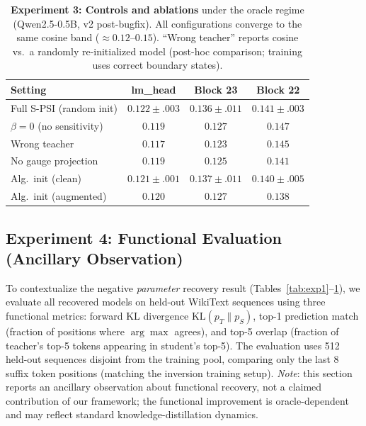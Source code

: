\documentclass{article}
\begin{document}
\begin{table}[t]
\centering
\caption{\textbf{Experiment 3: Controls and ablations} under the oracle regime (Qwen2.5-0.5B, v2 post-bugfix). All configurations converge to the same cosine band ($\approx 0.12$--$0.15$). ``Wrong teacher'' reports cosine vs.\ a randomly re-initialized model (post-hoc comparison; training uses correct boundary states).}
\label{tab:exp3}
\small
\begin{tabular}{@{}l ccc@{}}
\toprule
\textbf{Setting} & \textbf{lm\_head} & \textbf{Block 23} & \textbf{Block 22} \\
\midrule
Full S-PSI (random init)  & $0.122 \pm .003$ & $0.136 \pm .011$ & $0.141 \pm .003$ \\
$\beta = 0$ (no sensitivity) & $0.119$ & $0.127$ & $0.147$ \\
Wrong teacher             & $0.117$ & $0.123$ & $0.145$ \\
No gauge projection       & $0.119$ & $0.125$ & $0.141$ \\
Alg.\ init (clean)       & $0.121 \pm .001$ & $0.137 \pm .011$ & $0.140 \pm .005$ \\
Alg.\ init (augmented)   & $0.120$ & $0.127$ & $0.138$ \\
\bottomrule
\end{tabular}
\end{table}


\subsection{Experiment 4: Functional Evaluation (Ancillary Observation)}
\label{sec:exp4}

To contextualize the negative \emph{parameter} recovery result (Tables~\ref{tab:exp1}--\ref{tab:exp3}), we evaluate all recovered models on held-out WikiText sequences using three functional metrics: forward KL divergence $\mathrm{KL}(p_T \| p_S)$, top-1 prediction match (fraction of positions where $\arg\max$ agrees), and top-5 overlap (fraction of teacher's top-5 tokens appearing in student's top-5).  The evaluation uses 512 held-out sequences disjoint from the training pool, comparing only the last 8 suffix token positions (matching the inversion training setup).  \emph{Note}: this section reports an ancillary observation about functional recovery, not a claimed contribution of our framework; the functional improvement is oracle-dependent and may reflect standard knowledge-distillation dynamics.
\end{document}
